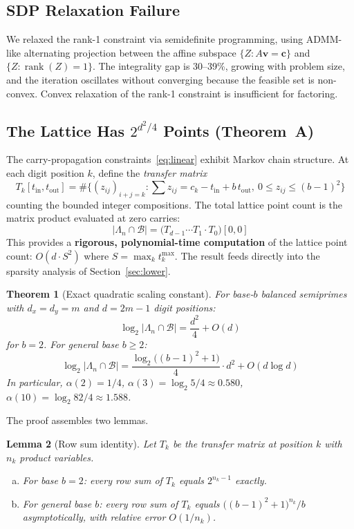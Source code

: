 \documentclass[11pt,a4paper]{article}
\newtheorem{theorem}{Theorem}
\newtheorem{lemma}[theorem]{Lemma}
\DeclareMathOperator{\rank}{rank}
\begin{document}
\subsection{SDP Relaxation Failure}

We relaxed the rank-1 constraint via semidefinite programming, using ADMM-like alternating projection between the affine subspace $\{Z : A\mathbf{v} = \mathbf{c}\}$ and $\{Z : \rank(Z) = 1\}$.  The integrality gap is 30--39\%, growing with problem size, and the iteration oscillates without converging because the feasible set is non-convex.  Convex relaxation of the rank-1 constraint is insufficient for factoring.

\subsection{The Lattice Has $2^{d^2/4}$ Points (Theorem~A)}

The carry-propagation constraints~\eqref{eq:linear} exhibit Markov chain structure.  At each digit position $k$, define the \emph{transfer matrix}
\[
T_k[t_{\mathrm{in}}, t_{\mathrm{out}}] = \#\bigl\{(z_{ij})_{i+j=k} : \textstyle\sum z_{ij} = c_k - t_{\mathrm{in}} + b\,t_{\mathrm{out}},\ 0 \le z_{ij} \le (b{-}1)^2\bigr\}
\]
counting the bounded integer compositions.  The total lattice point count is the matrix product evaluated at zero carries:
\[
|\Lambda_n \cap \mathcal{B}| = \bigl(T_{d-1} \cdots T_1 \cdot T_0\bigr)[0, 0]
\]
This provides a \textbf{rigorous, polynomial-time computation} of the lattice point count: $O(d \cdot S^2)$ where $S = \max_k t_k^{\max}$.  The result feeds directly into the sparsity analysis of Section~\ref{sec:lower}.

\begin{theorem}[Exact quadratic scaling constant]\label{thm:transfer}
For base-$b$ balanced semiprimes with $d_x = d_y = m$ and $d = 2m - 1$ digit positions:
\[
\log_2 |\Lambda_n \cap \mathcal{B}| = \frac{d^2}{4} + O(d)
\]
for $b = 2$.  For general base $b \ge 2$:
\[
\log_2 |\Lambda_n \cap \mathcal{B}| = \frac{\log_2\bigl((b{-}1)^2 + 1\bigr)}{4}\cdot d^2 + O(d \log d)
\]
In particular, $\alpha(2) = 1/4$, $\alpha(3) = \log_2 5 / 4 \approx 0.580$, $\alpha(10) = \log_2 82 / 4 \approx 1.588$.
\end{theorem}

The proof assembles two lemmas.

\begin{lemma}[Row sum identity]\label{lem:rowsum}
Let $T_k$ be the transfer matrix at position $k$ with $n_k$ product variables.
\begin{enumerate}[(a)]
\item For base $b = 2$: every row sum of $T_k$ equals $2^{n_k - 1}$ exactly.
\item For general base $b$: every row sum of $T_k$ equals $\bigl((b{-}1)^2 + 1\bigr)^{n_k} / b$ asymptotically, with relative error $O(1/n_k)$.
\end{enumerate}
\end{lemma}
\end{document}
